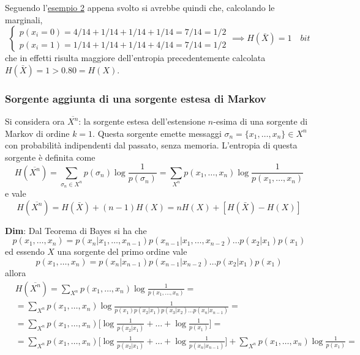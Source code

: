 Seguendo l'\hyperref[fig:markov2]{esempio 2} appena svolto si avrebbe quindi che, calcolando le marginali,
\begin{equation*}
    \begin{cases}
        p(x_i=0) = 4/14 + 1/14 + 1/14 + 1/14 = 7/14 = 1/2 \\
        p(x_i=1) = 1/14 + 1/14 + 1/14 + 4/14 = 7/14 = 1/2
    \end{cases} \implies H(\bar{X}) = 1 \quad bit
\end{equation*}
che in effetti risulta maggiore dell'entropia precedentemente calcolata $H(\bar{X}) = 1 > 0.80 = H(X)$.
\subsubsection{Sorgente aggiunta di una sorgente estesa di Markov}
Si considera ora $\overline{X^n}$: la sorgente estesa dell'estensione $n$-esima di una sorgente di Markov di ordine $k=1$. Questa sorgente emette messaggi $\sigma_n = \{x_1, \dots, x_n \} \in X^n$ con probabilit\`a indipendenti dal passato, senza memoria. L'entropia di questa sorgente \`e definita come
\begin{equation}
    H(\overline{X^n}) = \sum_{\sigma_n \in X^n} p(\sigma_n) \log \frac{1}{p(\sigma_n)} = \sum_{X^n} p(x_1, \dots, x_n) \log \frac{1}{p(x_1, \dots, x_n)}
\end{equation}
e vale
\begin{equation}
\label{eqn:adjmarko}
    H(\overline{X^n}) = H(\bar{X}) + (n-1)H(X) = nH(X) + [H(\bar{X}) - H(X)]
\end{equation}
\begin{tcolorbox}
\textbf{Dim}: Dal Teorema di Bayes si ha che
\begin{equation*}
    p(x_1, \dots, x_n) = p(x_n|x_1, \dots, x_{n-1}) p(x_{n-1}|x_1, \dots, x_{n-2}) \dots p(x_2|x_1) p(x_1)
\end{equation*}
ed essendo $X$ una sorgente del primo ordine vale
\begin{equation*}
    p(x_1, \dots, x_n) = p(x_n|x_{n-1}) p(x_{n-1}|x_{n-2}) \dots p(x_2|x_1) p(x_1)
\end{equation*}
allora
\begin{align*}
    &H(\overline{X^n}) = \sum_{X^n} p(x_1, \dots, x_n) \log \frac{1}{p(x_1, \dots, x_n)} = \\
    &= \sum_{X^n} p(x_1, \dots, x_n) \log \frac {1}{p(x_1)p(x_2|x_1) p(x_3|x_2) \dots p(x_n|x_{n-1})} = \\
    &=\sum_{X^n} p(x_1, \dots, x_n) \Big [\log \frac {1}{p(x_2|x_1)} + \dots + \log \frac{1}{p(x_1)} \Big ] = 
    \\ 
    &=\sum_{X^n} p(x_1, \dots, x_n) \Big [\log \frac {1}{p(x_2|x_1)} + \dots + \log \frac{1}{p(x_n|x_{n-1})} \Big ] + \sum_{X^n} p(x_1, \dots, x_n) \log \frac{1}{p(x_1)} =
    \end{align*}
    \end{tcolorbox}
